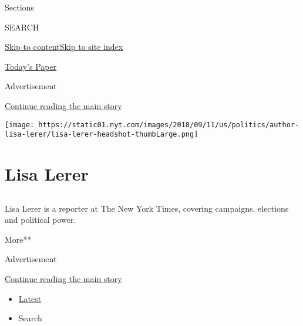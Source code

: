 Sections

SEARCH

\protect\hyperlink{site-content}{Skip to
content}\protect\hyperlink{site-index}{Skip to site index}

\href{https://myaccount.nytimes.com/auth/login?response_type=cookie\&client_id=vi}{}

\href{https://www.nytimes.com/section/todayspaper}{Today's Paper}

Advertisement

\protect\hyperlink{after-top}{Continue reading the main story}

\texttt{[image: https://static01.nyt.com/images/2018/09/11/us/politics/author-lisa-lerer/lisa-lerer-headshot-thumbLarge.png]}

\hypertarget{lisa-lerer}{%
\section{Lisa Lerer}\label{lisa-lerer}}

\subsection{}

Lisa Lerer is a reporter at The New York Times, covering campaigns,
elections and political power.

More**

Advertisement

\protect\hyperlink{after-mid1}{Continue reading the main story}

\begin{itemize}
\tightlist
\item
  \protect\hyperlink{stream-panel}{Latest}
\item
  Search
\end{itemize}


